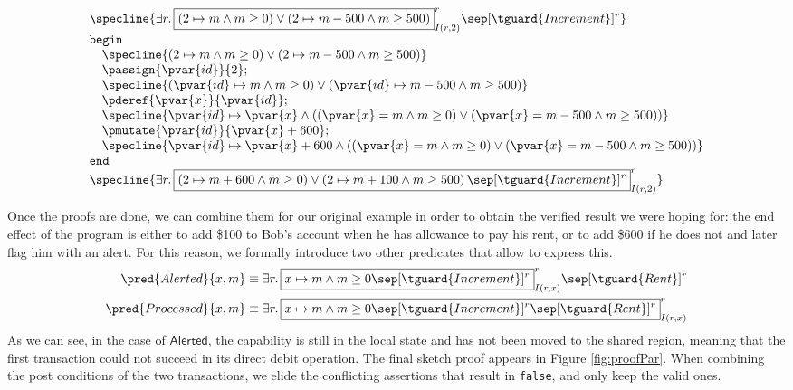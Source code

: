 \begin{center}
\[
	\begin{array}{l}
		\specline{
			\exists r \ldotp
				\boxed{
					\left( 2 \mapsto m \land m \geq 0 \right)
						\lor
					\left( 2 \mapsto m - 500 \land m \geq 500 \right) 
				}^r_{I(r, 2)}
				\sep [\tguard{Increment}]^r
		} \\
		\mathtt{begin} \\
			\quad \specline{
				\left( 2 \mapsto m \land m \geq 0 \right)
					\lor
				\left( 2 \mapsto m - 500 \land m \geq 500 \right) 
			} \\
			\quad \passign{\pvar{id}}{2}; \\
			\quad \specline{
				\left( \pvar{id} \mapsto m \land m \geq 0 \right)
					\lor
				\left( \pvar{id} \mapsto m - 500 \land m \geq 500 \right)
			} \\
			\quad \pderef{\pvar{x}}{\pvar{id}}; \\
			\quad \specline{
				\pvar{id} \mapsto \pvar{x}
					\land
				\left( \left( \pvar{x} = m \land m \geq 0 \right)
					\lor
				\left( \pvar{x} = m - 500 \land m \geq 500 \right) \right)
			} \\
			\quad \pmutate{\pvar{id}}{\pvar{x} + 600}; \\
			\quad \specline{
				\pvar{id} \mapsto \pvar{x} + 600
					\land
				\left( \left( \pvar{x} = m \land m \geq 0 \right)
					\lor
				\left( \pvar{x} = m - 500 \land m \geq 500 \right) \right)
			} \\
		\mathtt{end} \\
		\specline{
				\exists r \ldotp
					\boxed{
						\left( 2 \mapsto m + 600 \land m \geq 0 \right)
							\lor
						\left( 2 \mapsto m + 100 \land m \geq 500 \right)
						\sep [\tguard{Increment}]^r
					}^r_{I(r, 2)}
		}
	\end{array}
\]
\label{fig:proofR}
\end{center}
Once the proofs are done, we can combine them for our original example in order to obtain the verified result we were hoping for: the end effect of the program is either to add \$100 to Bob's account when he has allowance to pay his rent, or to add \$600 if he does not and later flag him with an alert. For this reason, we formally introduce two other predicates that allow to express this.
\begin{align*}
	\pred{Alerted}{x, m}
		&\equiv
	\exists r \ldotp
		\boxed{
			x \mapsto m \land m \geq 0
			\sep [\tguard{Increment}]^r
		}^r_{I(r, x)}
		\sep [\tguard{Rent}]^r
	\\
	\pred{Processed}{x, m}
		&\equiv
	\exists r \ldotp
		\boxed{
			x \mapsto m \land m \geq 0
			\sep [\tguard{Increment}]^r
			\sep [\tguard{Rent}]^r
		}^r_{I(r, x)}
\end{align*}
As we can see, in the case of $\mathsf{Alerted}$, the  capability is still in the local state and has not been moved to the shared region, meaning that the first transaction could not succeed in its direct debit operation. The final sketch proof appears in Figure \ref{fig:proofPar}. When combining the post conditions of the two transactions, we elide the conflicting assertions that result in \texttt{false}, and only keep the valid ones.

